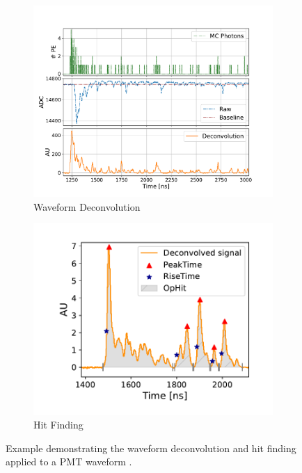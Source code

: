 \begin{figure}[b!]
        \centering
        \begin{subfigure}[b]{0.59\textwidth}
            \centering
            \includegraphics[width=\textwidth]{pds_reco_deconvolution}
            \caption{Waveform Deconvolution}
            \label{fig:pds_reco_deconvolution}
        \end{subfigure}
        \hfill
        \begin{subfigure}[b]{0.4\textwidth}  
            \centering 
            \includegraphics[width=\textwidth]{pds_reco_hit_finding}
            \caption{Hit Finding}
            \label{fig:pds_reco_hit_finding}
        \end{subfigure}
        \caption[Waveform Deconvolution and Hit Finding on PMT Waveforms]{
	Example demonstrating the waveform deconvolution and hit finding applied to a PMT waveform \cite{sbnd_pds_paper}.
	}
        \label{fig:pds_reco}
\end{figure}

